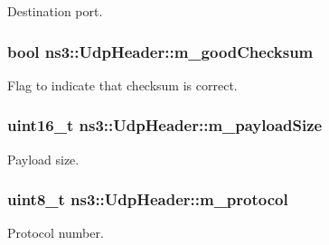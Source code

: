 Destination port. 

\subsubsection[{\texorpdfstring{m\+\_\+good\+Checksum}{m_goodChecksum}}]{\setlength{\rightskip}{0pt plus 5cm}bool ns3\+::\+Udp\+Header\+::m\+\_\+good\+Checksum\hspace{0.3cm}{\ttfamily [private]}}\hypertarget{classns3_1_1UdpHeader_ae4b6b68adf297aa0822d9f8a841d9a4a}{}\label{classns3_1_1UdpHeader_ae4b6b68adf297aa0822d9f8a841d9a4a}


Flag to indicate that checksum is correct. 

\subsubsection[{\texorpdfstring{m\+\_\+payload\+Size}{m_payloadSize}}]{\setlength{\rightskip}{0pt plus 5cm}uint16\+\_\+t ns3\+::\+Udp\+Header\+::m\+\_\+payload\+Size\hspace{0.3cm}{\ttfamily [private]}}\hypertarget{classns3_1_1UdpHeader_a733e8f1bd11c7238eca3d3686690dae1}{}\label{classns3_1_1UdpHeader_a733e8f1bd11c7238eca3d3686690dae1}


Payload size. 

\subsubsection[{\texorpdfstring{m\+\_\+protocol}{m_protocol}}]{\setlength{\rightskip}{0pt plus 5cm}uint8\+\_\+t ns3\+::\+Udp\+Header\+::m\+\_\+protocol\hspace{0.3cm}{\ttfamily [private]}}\hypertarget{classns3_1_1UdpHeader_a3c0ee9daf179e535e52bf6537b8bb095}{}\label{classns3_1_1UdpHeader_a3c0ee9daf179e535e52bf6537b8bb095}


Protocol number. 

